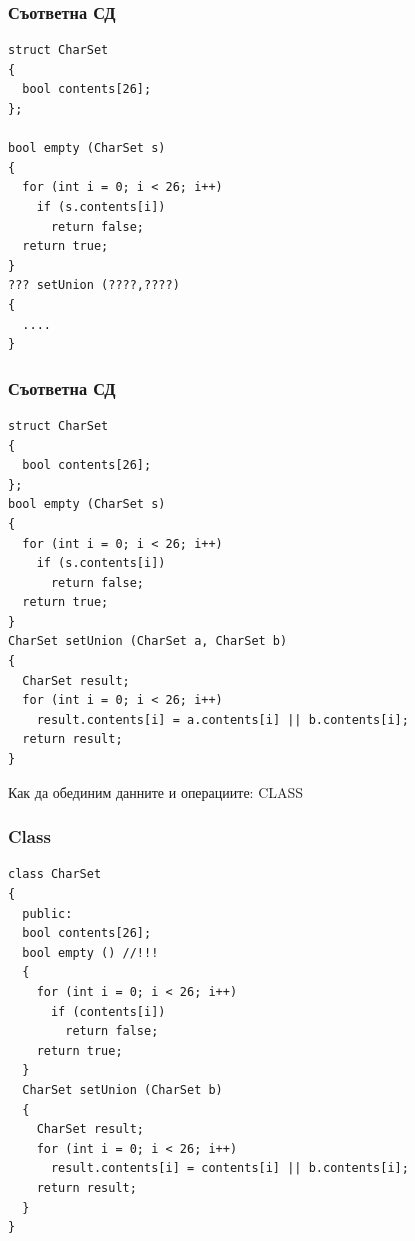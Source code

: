 \documentclass{beamer}
\begin{document}
\begin{frame}[fragile]
\frametitle{Съответна СД}


\begin{flushleft}
\begin{lstlisting}
struct CharSet
{
  bool contents[26];
};

bool empty (CharSet s)
{
  for (int i = 0; i < 26; i++)
    if (s.contents[i])
      return false;
  return true;
}
??? setUnion (????,????)
{
  ....
}
\end{lstlisting}
\end{flushleft}


\end{frame}

\begin{frame}[fragile]
\frametitle{Съответна СД}


\begin{flushleft}
\begin{lstlisting}
struct CharSet
{
  bool contents[26];
};
bool empty (CharSet s)
{
  for (int i = 0; i < 26; i++)
    if (s.contents[i])
      return false;
  return true;
}
CharSet setUnion (CharSet a, CharSet b)
{
  CharSet result;
  for (int i = 0; i < 26; i++)
    result.contents[i] = a.contents[i] || b.contents[i];
  return result;
}
\end{lstlisting}
\end{flushleft}


\end{frame}


\begin{frame}
\centerline{Как да обединим данните и операциите: CLASS}
\end{frame}



\begin{frame}[fragile]
\frametitle{Class}


\begin{flushleft}
\begin{lstlisting}
class CharSet
{
  public:
  bool contents[26];
  bool empty () //!!!
  {
    for (int i = 0; i < 26; i++)
      if (contents[i])
        return false;
    return true;
  }
  CharSet setUnion (CharSet b)
  {
    CharSet result;
    for (int i = 0; i < 26; i++)
      result.contents[i] = contents[i] || b.contents[i];
    return result;
  }
}
\end{lstlisting}
\end{flushleft}


\end{frame}
\end{document}
